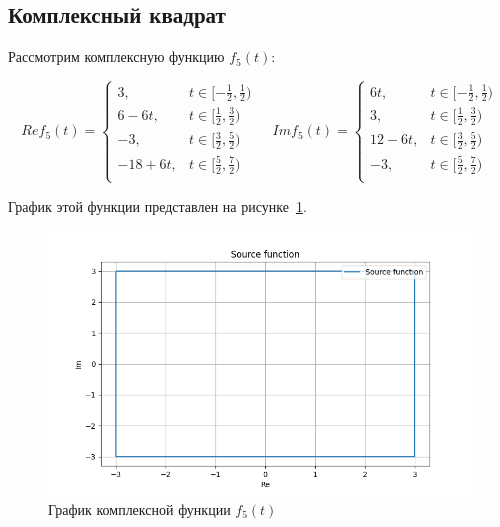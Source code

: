 \subsection{Комплексный квадрат}
Рассмотрим комплексную функцию  $f_5(t)$:

\begin{equation}
    Re f_5(t) = \begin{cases}
        3, & t \in [-\frac{1}{2}, \frac{1}{2})\\[0.75pt]
        6 - 6t, & t \in [\frac{1}{2}, \frac{3}{2})\\[0.75pt]
        -3, & t \in [\frac{3}{2}, \frac{5}{2})\\[0.75pt]
        -18 + 6t, & t \in [\frac{5}{2}, \frac{7}{2})\\[0.75pt]
    \end{cases} 
    ~~~~~
    Im f_5(t) = \begin{cases}
        6t, & t \in [-\frac{1}{2}, \frac{1}{2})\\[0.75pt]
        3, & t \in [\frac{1}{2}, \frac{3}{2})\\[0.75pt]
        12 - 6t, & t \in [\frac{3}{2}, \frac{5}{2})\\[0.75pt]
        -3, & t \in [\frac{5}{2}, \frac{7}{2})\\[0.75pt]
    \end{cases}
\label{eq:complex_func}
\end{equation}

График этой функции представлен на рисунке~\ref{fig:complex_func}.

\begin{figure}[ht!]
    \centering
    \includegraphics[width=\textwidth]{./media/plots/func_5.png}
    \caption{График комплексной функции $f_5(t)$}
    \label{fig:complex_func}
\end{figure}

